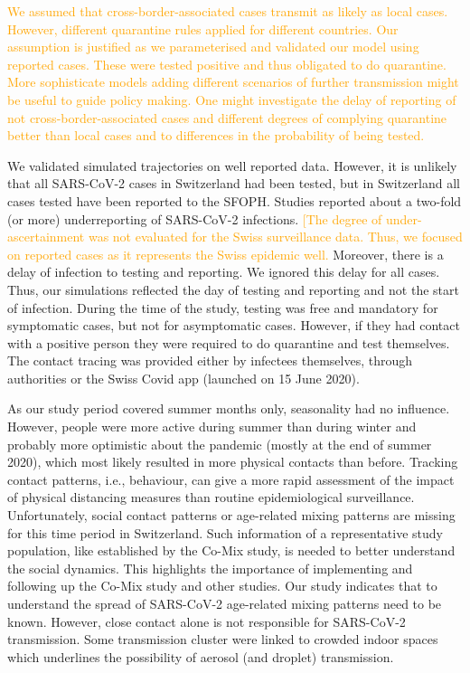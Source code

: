 \documentclass[10pt, a4paper, twoside]{article}
\begin{document}
\begin{multicols}{2}
\textcolor{orange}{We assumed that cross-border-associated cases transmit as likely as local cases.
However, different quarantine rules applied for different countries.
Our assumption is justified as we parameterised and validated our model using reported cases.
These were tested positive and thus obligated to do quarantine.
More sophisticate models adding different scenarios of further transmission might be useful to guide policy making.
One might investigate the delay of reporting of not cross-border-associated cases and different degrees of complying quarantine better than local cases and to differences in the probability of being tested.}


We validated simulated trajectories on well reported data.
However, it is unlikely that all SARS-CoV-2 cases in Switzerland had been tested, but in Switzerland all cases tested have been reported to the SFOPH.
Studies reported about a two-fold (or more) underreporting of SARS-CoV-2 infections.\cite{Li_substantial_2020,Wu_substantial_2020}
\textcolor{orange}{[The degree of under-ascertainment was not evaluated for the Swiss surveillance data.
Thus, we focused on reported cases as it represents the Swiss epidemic well.}
Moreover, there is a delay of infection to testing and reporting.
We ignored this delay for all cases.
Thus, our simulations reflected the day of testing and reporting and not the start of infection.
During the time of the study, testing was free and mandatory for symptomatic cases, but not for asymptomatic cases.
However, if they had contact with a positive person they were required to do quarantine and test themselves.
The contact tracing was provided either by infectees themselves, through authorities or the Swiss Covid app (launched on 15 June 2020).\cite{salath_early_2020}

As our study period covered summer months only, seasonality had no influence.
However, people were more active during summer than during winter and probably more optimistic about the pandemic (mostly at the end of summer 2020), which most likely resulted in more physical contacts than before.
Tracking contact patterns, i.e., behaviour, can give a more rapid assessment of the impact of physical distancing measures than routine epidemiological surveillance.\cite{jarvis_quantifying_2020}
Unfortunately, social contact patterns or age-related mixing patterns are missing for this time period in Switzerland.
Such information of a representative study population, like established by the Co-Mix study, is needed to better understand the social dynamics.\cite{coletti_comix_2020}
This highlights the importance of implementing and following up the Co-Mix study and other studies.
Our study indicates that to understand the spread of SARS-CoV-2 age-related mixing patterns need to be known.
However, close contact alone is not responsible for SARS-CoV-2 transmission.
Some transmission cluster were linked to crowded indoor spaces which underlines the possibility of aerosol (and droplet) transmission.\cite{tang_aerosol_2020}


\end{multicols}
\end{document}

